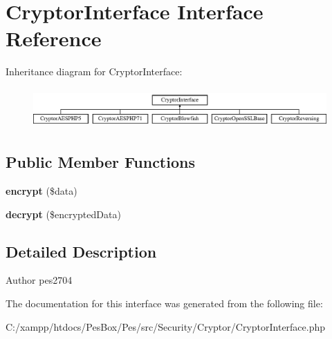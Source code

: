 \hypertarget{interface_pes_1_1_security_1_1_cryptor_1_1_cryptor_interface}{}\section{Cryptor\+Interface Interface Reference}
\label{interface_pes_1_1_security_1_1_cryptor_1_1_cryptor_interface}
Inheritance diagram for Cryptor\+Interface\+:\begin{figure}[H]
\begin{center}
\leavevmode
\includegraphics[height=1.544828cm]{interface_pes_1_1_security_1_1_cryptor_1_1_cryptor_interface}
\end{center}
\end{figure}
\subsection*{Public Member Functions}
\begin{DoxyCompactItemize}
\item 
\mbox{\label{interface_pes_1_1_security_1_1_cryptor_1_1_cryptor_interface_a07bcc8ef1d23370470ecb5ae8fc07dfa}} 
{\bfseries encrypt} (\$data)
\item 
\mbox{\label{interface_pes_1_1_security_1_1_cryptor_1_1_cryptor_interface_ac5a3db4820ef04ce648cd623192c8d96}} 
{\bfseries decrypt} (\$encrypted\+Data)
\end{DoxyCompactItemize}


\subsection{Detailed Description}
\begin{DoxyAuthor}{Author}
pes2704 
\end{DoxyAuthor}


The documentation for this interface was generated from the following file\+:\begin{DoxyCompactItemize}
\item 
C\+:/xampp/htdocs/\+Pes\+Box/\+Pes/src/\+Security/\+Cryptor/Cryptor\+Interface.\+php\end{DoxyCompactItemize}
